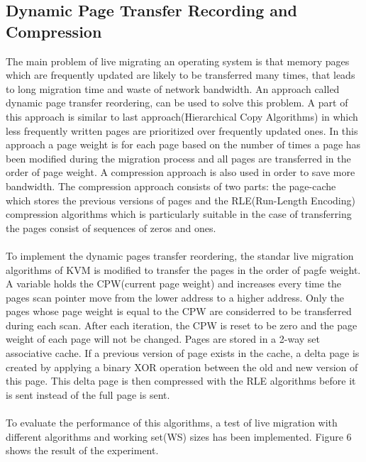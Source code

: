 \documentclass[runningheads]{llncs}
\begin{document}
\subsection{Dynamic Page Transfer Recording and Compression}
The main problem of live migrating an operating system is that memory pages which are frequently updated are likely to be transferred many times, that leads to long migration time and waste of network bandwidth. An approach called dynamic page transfer reordering, can be used to solve this problem. A part of this approach is similar to last approach(Hierarchical Copy Algorithms) in which less frequently written pages are prioritized over frequently updated ones. In this approach a page weight is for each page based on the number of times a page has been modified during the migration process and all pages are transferred in the order of page weight. A compression approach is also used in order to save more bandwidth. The compression approach consists of two parts: the page-cache which stores the previous versions of pages and the  RLE(Run-Length Encoding) compression algorithms\cite{run2014wiki} which is particularly suitable in the case of transferring the pages consist of sequences of zeros and ones.
\\\\
To implement the dynamic pages transfer reordering, the standar live migration algorithms of KVM is modified to transfer the pages in the order of pagfe weight. A variable holds the CPW(current page weight) and increases every time the pages scan pointer move from the lower address to a higher address. Only the pages whose page weight is equal to the CPW are considerred to be transferred during each scan. After each iteration, the CPW is reset to be zero and the page weight of each page will not be changed. Pages are stored in a 2-way set associative cache\cite{ulrich2007memory}. If a previous version of page exists in the cache, a delta page is created by applying a binary XOR operation between the old and new version of this page. This delta page is then compressed with the RLE algorithms before it is sent instead of the full page is sent.
\\\\
To evaluate the performance of this algorithms, a test of live migration with different algorithms and working set(WS) sizes has been implemented. Figure 6 shows the result of the experiment.
\end{document}
